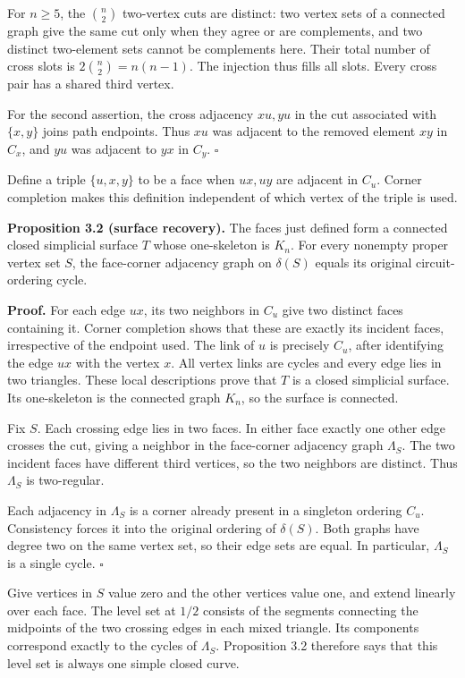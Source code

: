 \documentclass[11pt]{article}
\begin{document}
For $n\ge5$, the $\binom n2$ two-vertex cuts are distinct: two vertex sets of a connected graph give the same cut only when they agree or are complements, and two distinct two-element sets cannot be complements here. Their total number of cross slots is $2\binom n2=n(n-1)$. The injection thus fills all slots. Every cross pair has a shared third vertex.

For the second assertion, the cross adjacency $xu,yu$ in the cut associated with $\{x,y\}$ joins path endpoints. Thus $xu$ was adjacent to the removed element $xy$ in $C_x$, and $yu$ was adjacent to $yx$ in $C_y$. $\square$

Define a triple $\{u,x,y\}$ to be a face when $ux,uy$ are adjacent in $C_u$. Corner completion makes this definition independent of which vertex of the triple is used.

\textbf{Proposition 3.2 (surface recovery).} The faces just defined form a connected closed simplicial surface $T$ whose one-skeleton is $K_n$. For every nonempty proper vertex set $S$, the face-corner adjacency graph on $\delta(S)$ equals its original circuit-ordering cycle.

\textbf{Proof.} For each edge $ux$, its two neighbors in $C_u$ give two distinct faces containing it. Corner completion shows that these are exactly its incident faces, irrespective of the endpoint used. The link of $u$ is precisely $C_u$, after identifying the edge $ux$ with the vertex $x$. All vertex links are cycles and every edge lies in two triangles. These local descriptions prove that $T$ is a closed simplicial surface. Its one-skeleton is the connected graph $K_n$, so the surface is connected.

Fix $S$. Each crossing edge lies in two faces. In either face exactly one other edge crosses the cut, giving a neighbor in the face-corner adjacency graph $\Lambda_S$. The two incident faces have different third vertices, so the two neighbors are distinct. Thus $\Lambda_S$ is two-regular.

Each adjacency in $\Lambda_S$ is a corner already present in a singleton ordering $C_u$. Consistency forces it into the original ordering of $\delta(S)$. Both graphs have degree two on the same vertex set, so their edge sets are equal. In particular, $\Lambda_S$ is a single cycle. $\square$

Give vertices in $S$ value zero and the other vertices value one, and extend linearly over each face. The level set at $1/2$ consists of the segments connecting the midpoints of the two crossing edges in each mixed triangle. Its components correspond exactly to the cycles of $\Lambda_S$. Proposition 3.2 therefore says that this level set is always one simple closed curve.
\end{document}
